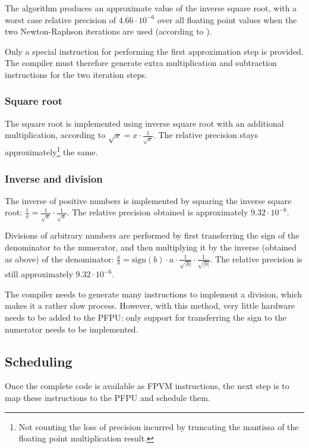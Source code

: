 \documentclass[a4paper,11pt]{kthesis}
\begin{document}
The algorithm produces an approximate value of the inverse square root, with a worst case relative precision of $4.66 \cdot 10^{-6}$ over all floating point values when the two Newton-Raphson iterations are used (according to \cite{invsqrt}).

Only a special instruction for performing the first approximation step is provided. The compiler must therefore generate extra multiplication and subtraction instructions for the two iteration steps.

\subsubsection{Square root}
The square root is implemented using inverse square root with an additional multiplication, according to $\sqrt{x} = x \cdot \frac{1}{\sqrt{x}}$. The relative precision stays approximately\footnote{Not counting the loss of precision incurred by truncating the mantissa of the floating point multiplication result.} the same.

\subsubsection{Inverse and division}
The inverse of positive numbers is implemented by squaring the inverse square root: $\frac{1}{x} = \frac{1}{\sqrt{x}} \cdot \frac{1}{\sqrt{x}}$. The relative precision obtained is approximately $9.32 \cdot 10^{-6}$.

Divisions of arbitrary numbers are performed by first transferring the sign of the denominator to the numerator, and then multiplying it by the inverse (obtained as above) of the denominator: $\frac{a}{b} = \textrm{sign}(b) \cdot a \cdot \frac{1}{\sqrt{|b|}} \cdot \frac{1}{\sqrt{|b|}}$. The relative precision is still approximately $9.32 \cdot 10^{-6}$.

The compiler needs to generate many instructions to implement a division, which makes it a rather slow process. However, with this method, very little hardware needs to be added to the PFPU: only support for transferring the sign to the numerator needs to be implemented.

\subsection{Scheduling}
\label{subsec:vliwsched}
Once the complete code is available as FPVM instructions, the next step is to map these instructions to the PFPU and schedule them.
\end{document}
